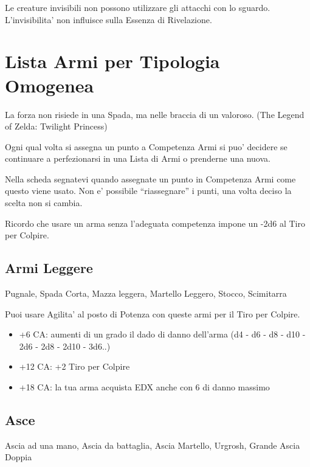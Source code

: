 \documentclass[a4paper,11pt,twoside,openany]{dndbook}
\begin{document}
Le creature invisibili non possono utilizzare gli attacchi con lo sguardo. L'invisibilita' non influisce sulla Essenza di Rivelazione.

\pagebreak

\section{Lista Armi per Tipologia Omogenea}

\label{lista-armi-per-tipologia-omogenea}
\begin{quotebox}La forza non risiede in una Spada, ma nelle braccia di un valoroso. (The Legend of Zelda: Twilight Princess)
\end{quotebox}

Ogni qual volta si assegna un punto a Competenza Armi si puo' decidere se continuare a perfezionarsi in una Lista di Armi o prenderne una nuova.

Nella scheda segnatevi quando assegnate un punto in Competenza Armi come questo viene usato. Non e' possibile ``riassegnare'' i punti, una volta deciso la scelta non si cambia.

Ricordo che usare un arma senza l'adeguata competenza impone un -2d6 al Tiro per Colpire.

\subsection{Armi Leggere}Pugnale, Spada Corta, Mazza leggera, Martello Leggero, Stocco, Scimitarra

Puoi usare Agilita' al posto di Potenza con queste armi per il Tiro
per Colpire.

\begin{itemize}
	\item +6 CA: aumenti di un grado il dado di danno dell'arma (d4 - d6 - d8 - d10 - 2d6 - 2d8 - 2d10 - 3d6..)
	
	\item +12 CA: +2 Tiro per Colpire
	
	\item +18 CA: la tua arma acquista EDX anche con 6 di danno massimo 
\end{itemize}

\subsection{Asce} Ascia ad una mano, Ascia da battaglia, Ascia Martello, Urgrosh, Grande Ascia Doppia
\end{document}
